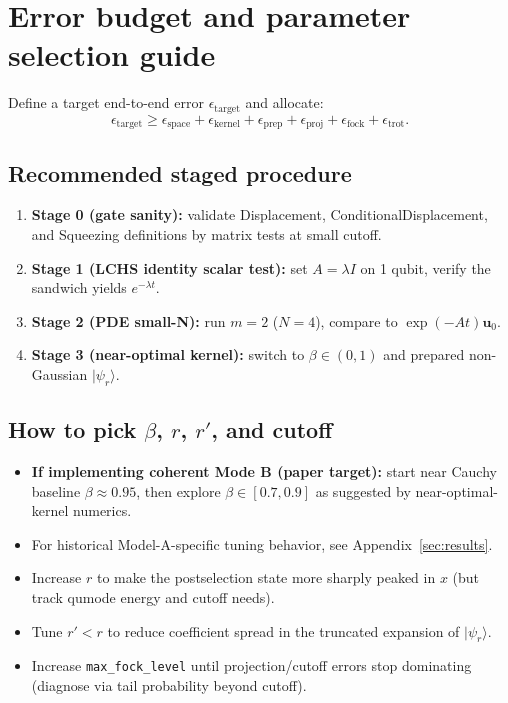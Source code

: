 \documentclass[11pt]{article}
\begin{document}
\section{Error budget and parameter selection guide}

Define a target end-to-end error $\epsilon_{\mathrm{target}}$ and allocate:
\[
\epsilon_{\mathrm{target}}
\ge
\epsilon_{\mathrm{space}}
+\epsilon_{\mathrm{kernel}}
+\epsilon_{\mathrm{prep}}
+\epsilon_{\mathrm{proj}}
+\epsilon_{\mathrm{fock}}
+\epsilon_{\mathrm{trot}}.
\]

\subsection{Recommended staged procedure}
\begin{enumerate}[itemsep=3pt,topsep=3pt]
\item \textbf{Stage 0 (gate sanity):} validate Displacement, ConditionalDisplacement, and Squeezing definitions by matrix tests at small cutoff.
\item \textbf{Stage 1 (LCHS identity scalar test):} set $A=\lambda I$ on 1 qubit, verify the sandwich yields $e^{-\lambda t}$.
\item \textbf{Stage 2 (PDE small-N):} run $m=2$ ($N=4$), compare to $\exp(-At)\mathbf u_0$.
\item \textbf{Stage 3 (near-optimal kernel):} switch to $\beta\in(0,1)$ and prepared non-Gaussian $|\psi_r\rangle$.
\end{enumerate}

\subsection{How to pick $\beta$, $r$, $r'$, and cutoff}
\begin{itemize}[itemsep=3pt,topsep=3pt]
\item \textbf{If implementing coherent Mode B (paper target):} start near Cauchy baseline \(\beta\approx 0.95\),
then explore \(\beta\in[0.7,0.9]\) as suggested by near-optimal-kernel numerics.
\item For historical Model-A-specific tuning behavior, see Appendix~\ref{sec:results}.
\item Increase $r$ to make the postselection state more sharply peaked in $x$ (but track qumode energy and cutoff needs).
\item Tune $r'<r$ to reduce coefficient spread in the truncated expansion of $|\psi_r\rangle$.
\item Increase \texttt{max\_fock\_level} until projection/cutoff errors stop dominating (diagnose via tail probability beyond cutoff).
\end{itemize}
\end{document}
